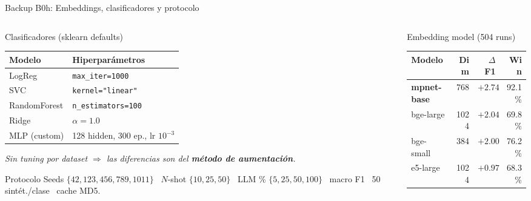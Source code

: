 \begin{frame}{Backup B0h: Embeddings, clasificadores y protocolo}
\scriptsize
\begin{columns}[T]

\begin{column}{0.50\textwidth}
\begin{block}{Clasificadores (sklearn defaults)}
\scriptsize
\begin{tabular}{@{}ll@{}}
\toprule
Modelo & Hiperparámetros \\
\midrule
LogReg        & \texttt{max\_iter=1000} \\
SVC           & \texttt{kernel="linear"} \\
RandomForest  & \texttt{n\_estimators=100} \\
Ridge         & $\alpha = 1.0$ \\
MLP (custom)  & 128 hidden, 300 ep., lr $10^{-3}$ \\
\bottomrule
\end{tabular}

\vspace{0.2em}
{\itshape Sin tuning por dataset $\Rightarrow$ las diferencias son del \textbf{método de aumentación}.}
\end{block}

\vspace{0.3em}
\begin{block}{Protocolo}
\scriptsize
Seeds $\{42, 123, 456, 789, 1011\}$ \textperiodcentered\ $N$-shot $\{10, 25, 50\}$ \textperiodcentered\ LLM \% $\{5, 25, 50, 100\}$ \textperiodcentered\ macro F1 \textperiodcentered\ 50 sintét./clase \textperiodcentered\ cache MD5.
\end{block}
\end{column}

\begin{column}{0.50\textwidth}
\begin{block}{Embedding model (504 runs)}
\scriptsize
\begin{tabular}{@{}lrrr@{}}
\toprule
Modelo & Dim & $\Delta$F1 & Win \\
\midrule
\rowcolor{uaigreen!12}
\textbf{mpnet-base} & 768  & \alert{$+2.74$} & 92.1\% \\
bge-large           & 1024 & $+2.04$         & 69.8\% \\
bge-small           & 384  & $+2.00$         & 76.2\% \\
e5-large            & 1024 & $+0.97$         & 68.3\% \\
\bottomrule
\end{tabular}


\end{block}
\end{column}
\end{columns}
\end{frame}
